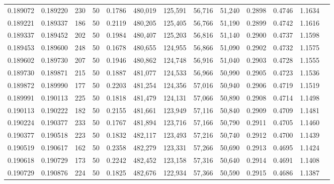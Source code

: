 \begin{tabular}{rrrrrrrrrrrrr}
0.189072 & 0.189220 &   230 &  50 &                                     0.1786 & 480,019 & 125,591 &  56,716 &  51,240 & 0.2898 & 0.4746 & 1.1634 \\
0.189221 & 0.189337 &   186 &  50 &                                     0.2119 & 480,205 & 125,405 &  56,766 &  51,190 & 0.2899 & 0.4742 & 1.1616 \\
0.189337 & 0.189452 &   202 &  50 &                                     0.1984 & 480,407 & 125,203 &  56,816 &  51,140 & 0.2900 & 0.4737 & 1.1598 \\
0.189453 & 0.189600 &   248 &  50 &                                     0.1678 & 480,655 & 124,955 &  56,866 &  51,090 & 0.2902 & 0.4732 & 1.1575 \\
0.189602 & 0.189730 &   207 &  50 &                                     0.1946 & 480,862 & 124,748 &  56,916 &  51,040 & 0.2903 & 0.4728 & 1.1555 \\
0.189730 & 0.189871 &   215 &  50 &                                     0.1887 & 481,077 & 124,533 &  56,966 &  50,990 & 0.2905 & 0.4723 & 1.1536 \\
0.189872 & 0.189990 &   177 &  50 &                                     0.2203 & 481,254 & 124,356 &  57,016 &  50,940 & 0.2906 & 0.4719 & 1.1519 \\
0.189991 & 0.190113 &   225 &  50 &                                     0.1818 & 481,479 & 124,131 &  57,066 &  50,890 & 0.2908 & 0.4714 & 1.1498 \\
0.190113 & 0.190222 &   182 &  50 &                                     0.2155 & 481,661 & 123,949 &  57,116 &  50,840 & 0.2909 & 0.4709 & 1.1481 \\
0.190224 & 0.190377 &   233 &  50 &                                     0.1767 & 481,894 & 123,716 &  57,166 &  50,790 & 0.2911 & 0.4705 & 1.1460 \\
0.190377 & 0.190518 &   223 &  50 &                                     0.1832 & 482,117 & 123,493 &  57,216 &  50,740 & 0.2912 & 0.4700 & 1.1439 \\
0.190519 & 0.190617 &   162 &  50 &                                     0.2358 & 482,279 & 123,331 &  57,266 &  50,690 & 0.2913 & 0.4695 & 1.1424 \\
0.190618 & 0.190729 &   173 &  50 &                                     0.2242 & 482,452 & 123,158 &  57,316 &  50,640 & 0.2914 & 0.4691 & 1.1408 \\
0.190729 & 0.190876 &   224 &  50 &                                     0.1825 & 482,676 & 122,934 &  57,366 &  50,590 & 0.2915 & 0.4686 & 1.1387 \\

\end{tabular}
